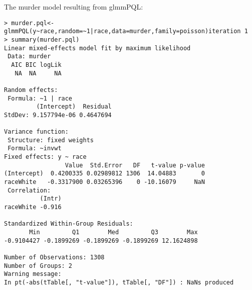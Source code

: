 \documentclass{article}
\begin{document}
The murder model resulting from glmmPQL:
\begin{verbatim}
> murder.pql<-glmmPQL(y~race,random=~1|race,data=murder,family=poisson)iteration 1
> summary(murder.pql)
Linear mixed-effects model fit by maximum likelihood
 Data: murder 
  AIC BIC logLik
   NA  NA     NA

Random effects:
 Formula: ~1 | race
         (Intercept)  Residual
StdDev: 9.157794e-06 0.4647694

Variance function:
 Structure: fixed weights
 Formula: ~invwt 
Fixed effects: y ~ race 
                 Value  Std.Error   DF   t-value p-value
(Intercept)  0.4200335 0.02989812 1306  14.04883       0
raceWhite   -0.3317900 0.03265396    0 -10.16079     NaN
 Correlation: 
          (Intr)
raceWhite -0.916

Standardized Within-Group Residuals:
       Min         Q1        Med         Q3        Max 
-0.9104427 -0.1899269 -0.1899269 -0.1899269 12.1624898 

Number of Observations: 1308
Number of Groups: 2 
Warning message:
In pt(-abs(tTable[, "t-value"]), tTable[, "DF"]) : NaNs produced

\end{verbatim}

%
%
%
%
%
%
%
%
%
%
%
\end{document}
